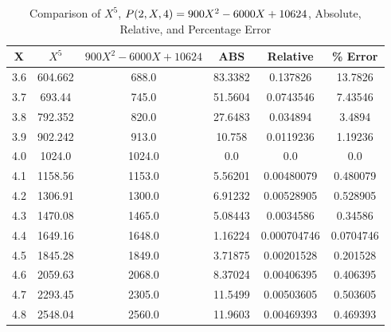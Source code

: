 ﻿\begin{table}[h!]
    \centering
    \caption{Comparison of $X^5$, ${P}(2,X,4) = 900X^2 - 6000X + 10624$, Absolute, Relative, and Percentage Error}
    \begin{tabular}{|c|c|c|c|c|c|}
        \hline
        \textbf{X} & \textbf{$X^5$} & \textbf{$900X^2 - 6000X + 10624$} & \textbf{ABS} & \textbf{Relative} & \textbf{\% Error} \\ \hline
        3.6        & 604.662        & 688.0                             & 83.3382      & 0.137826          & 13.7826           \\ \hline
        3.7        & 693.44         & 745.0                             & 51.5604      & 0.0743546         & 7.43546           \\ \hline
        3.8        & 792.352        & 820.0                             & 27.6483      & 0.034894          & 3.4894            \\ \hline
        3.9        & 902.242        & 913.0                             & 10.758       & 0.0119236         & 1.19236           \\ \hline
        4.0        & 1024.0         & 1024.0                            & 0.0          & 0.0               & 0.0               \\ \hline
        4.1        & 1158.56        & 1153.0                            & 5.56201      & 0.00480079        & 0.480079          \\ \hline
        4.2        & 1306.91        & 1300.0                            & 6.91232      & 0.00528905        & 0.528905          \\ \hline
        4.3        & 1470.08        & 1465.0                            & 5.08443      & 0.0034586         & 0.34586           \\ \hline
        4.4        & 1649.16        & 1648.0                            & 1.16224      & 0.000704746       & 0.0704746         \\ \hline
        4.5        & 1845.28        & 1849.0                            & 3.71875      & 0.00201528        & 0.201528          \\ \hline
        4.6        & 2059.63        & 2068.0                            & 8.37024      & 0.00406395        & 0.406395          \\ \hline
        4.7        & 2293.45        & 2305.0                            & 11.5499      & 0.00503605        & 0.503605          \\ \hline
        4.8        & 2548.04        & 2560.0                            & 11.9603      & 0.00469393        & 0.469393          \\ \hline

\end{tabular}
\end{table}
